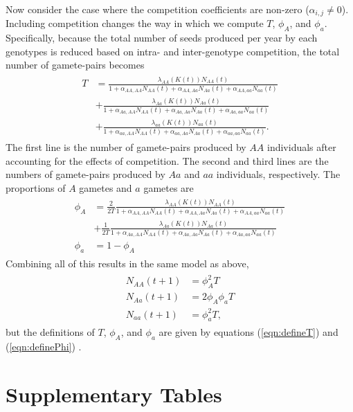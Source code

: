 \documentclass[11pt]{article}
\begin{document}
Now consider the case where the competition coefficients are non-zero ($\alpha_{i,j}\neq0$).  Including competition changes the way in which we compute $T$, $\phi_A$, and $\phi_a$.  Specifically, because the total number of seeds produced per year by each genotypes is reduced based on intra- and inter-genotype competition, the total number of gamete-pairs becomes
\begin{align}\begin{split}
T &=  \frac{\lambda_{AA}(K(t))N_{AA}(t)}{1+ \alpha_{AA,AA}N_{AA}(t) + \alpha_{AA,Aa}N_{Aa}(t)+ \alpha_{AA,aa}N_{aa}(t)} \\ 
&+ \frac{\lambda_{Aa}(K(t))N_{Aa}(t)}{1+ \alpha_{Aa,AA}N_{AA}(t) + \alpha_{Aa,Aa}N_{Aa}(t)+ \alpha_{Aa,aa}N_{aa}(t)}\\
&+\frac{\lambda_{aa}(K(t))N_{aa}(t)}{1+ \alpha_{aa,AA}N_{AA}(t) + \alpha_{aa,Aa}N_{Aa}(t)+ \alpha_{aa,aa}N_{aa}(t)}.
\label{eqn:defineT}
\end{split}\end{align}
The first line is the number of gamete-pairs produced by $AA$ individuals after accounting for the effects of competition.  The second and third lines are the numbers of gamete-pairs produced by $Aa$ and $aa$ individuals, respectively. The proportions of $A$ gametes and $a$ gametes are 
\begin{align}\begin{split}
\phi_A &= \frac{2}{2T}\frac{\lambda_{AA}(K(t))N_{AA}(t)}{1+ \alpha_{AA,AA}N_{AA}(t) + \alpha_{AA,Aa}N_{Aa}(t)+ \alpha_{AA,aa}N_{aa}(t)} \\
&+ \frac{1}{2T}\frac{\lambda_{Aa}(K(t))N_{Aa}(t)}{1+ \alpha_{Aa,AA}N_{AA}(t) + \alpha_{Aa,Aa}N_{Aa}(t)+ \alpha_{Aa,aa}N_{aa}(t)}\\
\phi_a &= 1- \phi_A
\label{eqn:definePhi}
\end{split}\end{align}
Combining all of this results in the same model as above,
\begin{align}\begin{split}
N_{AA}(t+1) &= \phi_A^2T\\
N_{Aa}(t+1) &= 2 \phi_A\phi_aT\\
N_{aa}(t+1) &= \phi_a^2T,
\end{split}\end{align}
but the definitions of $T$, $\phi_A$, and $\phi_a$ are given by equations (\ref{eqn:defineT}) and (\ref{eqn:definePhi}) . 

\newpage 

\section*{Supplementary Tables}
\end{document}
